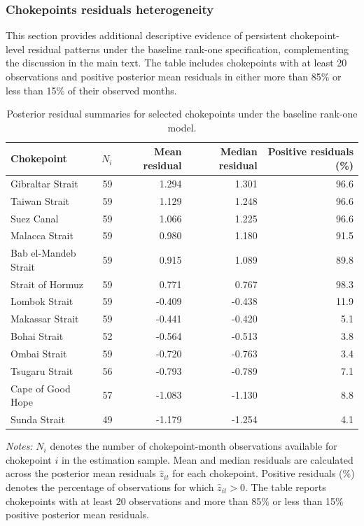 \documentclass[pdftex,12pt,openright,a4paper,oneside]{book}
\begin{document}
\subsubsection{Chokepoints residuals heterogeneity}
\label{app:chokepoint_residuals}

This section provides additional descriptive evidence of persistent
chokepoint-level residual patterns under the baseline rank-one
specification, complementing the discussion in the main text.
The table includes chokepoints with at least 20 observations and
positive posterior mean residuals in either more than 85\% or
less than 15\% of their observed months.

\begin{table}[htbp]
\centering
\caption{Posterior residual summaries for selected chokepoints
under the baseline rank-one model.}
\label{tab:chokepoint_residual_summary}
\small
\begin{tabular}{lrrrr}
\toprule
Chokepoint & $N_i$ & Mean residual & Median residual & Positive residuals (\%) \\
\midrule
Gibraltar Strait & 59 & 1.294 & 1.301 & 96.6 \\
Taiwan Strait & 59 & 1.129 & 1.248 & 96.6 \\
Suez Canal & 59 & 1.066 & 1.225 & 96.6 \\
Malacca Strait & 59 & 0.980 & 1.180 & 91.5 \\
Bab el-Mandeb Strait & 59 & 0.915 & 1.089 & 89.8 \\
Strait of Hormuz & 59 & 0.771 & 0.767 & 98.3 \\
\midrule
Lombok Strait & 59 & -0.409 & -0.438 & 11.9 \\
Makassar Strait & 59 & -0.441 & -0.420 & 5.1 \\
Bohai Strait & 52 & -0.564 & -0.513 & 3.8 \\
Ombai Strait & 59 & -0.720 & -0.763 & 3.4 \\
Tsugaru Strait & 56 & -0.793 & -0.789 & 7.1 \\
Cape of Good Hope & 57 & -1.083 & -1.130 & 8.8 \\
Sunda Strait & 49 & -1.179 & -1.254 & 4.1 \\
\bottomrule
\end{tabular}

\vspace{0.2cm}
\begin{minipage}{\textwidth}
\footnotesize
\textit{Notes:} $N_i$ denotes the number of chokepoint-month
observations available for chokepoint $i$ in the estimation sample.
Mean and median residuals are calculated across the posterior
mean residuals $\widehat{z}_{it}$ for each chokepoint.
Positive residuals (\%) denotes the percentage of observations
for which $\widehat{z}_{it}>0$.
The table reports chokepoints with at least 20 observations
and more than 85\% or less than 15\% positive posterior mean residuals.
\end{minipage}
\end{table}
\end{document}

